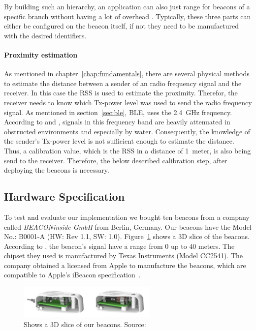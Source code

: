By building such an hierarchy, an application can also just range for beacons of a specific branch without having a lot of overhead \citep{apple:getting_started,binside:ds}. Typically, these three parts can either be configured on the beacon itself, if not they need to be manufactured with the desired identifiers.

\paragraph{Proximity estimation} As mentioned in chapter~\ref{chap:fundamentals}, there are several physical methods to estimate the distance between a sender of an radio frequency signal and the receiver. In this case the \acl{RSS} is used to estimate the proximity. Therefor, the receiver needs to know which Tx-power level was used to send the radio frequency signal. As mentioned in section~\ref{sec:ble}, \ac{BLE}, uses the 2.4~GHz frequency. According to \citet{apple:getting_started} and \citet{binside:ds}, signals in this frequency band are heavily attenuated in obstructed environments and especially by water. Consequently, the knowledge of the sender's Tx-power level is not sufficient enough to estimate the distance. Thus, a calibration value, which is the \acl{RSS} in a distance of 1~meter, is also being send to the receiver. Therefore, the below described calibration step, after deploying the beacons is necessary.

\subsection{Hardware Specification} To test and evaluate our implementation we bought ten beacons from a company called \emph{BEACONinside GmbH} from Berlin, Germany. Our beacons have the Model No.: B0001-A (HW: Rev 1.1, SW: 1.0). Figure~\ref{fig:bi:beacons} shows a 3D slice of the beacons. According to \citet{binside:ds}, the beacon's signal have a range from 0 up to 40 meters. The chipset they used is manufactured by Texas Instruments (Model CC2541). The company obtained a licensed from Apple to manufacture the beacons, which are compatible to Apple's iBeacon specification~\citep{binside:ds}.

\begin{figure}
\includegraphics[width=0.6\textwidth]{figures/BEACONinside_beacons}
\caption{Shows a 3D slice of our beacons. Source:~\citep{binside:ds}}
\label{fig:bi:beacons}
\end{figure}

